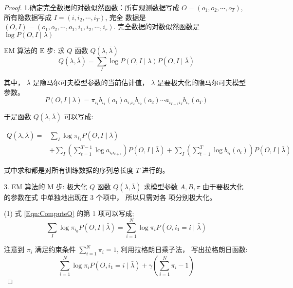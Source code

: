 \begin{proof}
    1.确定完全数据的对数似然函数：所有观测数据写成 $ O=\left(o_{1}, o_{2}, \cdots, o_{T}\right) $, 所有隐数据写成 $ I=\left(i, i_{2}, \cdots, i_{T}\right) $, 完全 数据是 $ (O, I)=\left(o_{1}, o_{2}, \cdots, o_{T}, i_{1}, i_{2}, \cdots, i_{r}\right) . $ 完全数据的对数似然函数是 $ \log P(O, I \mid \lambda) $


EM 算法的 $ \mathrm{E} $ 步: 求 $ Q $ 函数 $ Q(\lambda, \bar{\lambda}) $
\begin{equation}
Q(\lambda, \bar{\lambda})=\sum_{I} \log P(O, I \mid \lambda) P(O, I \mid \bar{\lambda})
\end{equation}

其中， $ \bar{\lambda} $ 是隐马尔可夫模型参数的当前估计值， $ \lambda $ 是要极大化的隐马尔可夫模型参数。
\begin{equation} P(O, I \mid \lambda)=\pi_{i_{1}} b_{i_{1}}\left(o_{1}\right) a_{i_1 i_{2}} b_{i_{2}}\left(o_{2}\right) \cdots a_{i_{T-1} i_{T}} b_{i_{r}}\left(o_{T}\right) \end{equation}

于是函数 $ Q(\lambda, \bar{\lambda}) $ 可以写成:

\begin{equation}
    \label{Eqn:ComputeQ}
\begin{aligned}
Q(\lambda, \bar{\lambda})=& \sum_{I} \log \pi_{i_1} P(O, I \mid \bar{\lambda}) \\
&+\sum_{I}\left(\sum_{t=1}^{T-1} \log a_{i_t i_{t+1}}\right) P(O, I \mid \bar{\lambda})+\sum_{I}\left(\sum_{t=1}^{T} \log b_{i_{t}}\left(o_{t}\right)\right) P(O, I \mid \bar{\lambda})
\end{aligned}
\end{equation}


式中求和都是对所有训练数据的序列总长度 $ T $ 进行的。


3. EM 算法的 $ \mathrm{M} $ 步: 极大化 $ Q $ 函数 $ Q(\lambda, \bar{\lambda}) $ 求模型参数 $ A, B, \pi $ 由于要极大化的参数在式 中单独地出现在 3 个项中， 所以只需对各 项分别极大化。

(1) 式 \ref{Eqn:ComputeQ} 的第 1 项可以写成;
\begin{equation}
\sum_{I} \log \pi_{i_{0}} P(O, I \mid \bar{\lambda})=\sum_{i=1}^{N} \log \pi_{i} P\left(O, i_{1}=i \mid \bar{\lambda}\right)
\end{equation}

注意到 $ \pi_{i} $ 满足约束条件 $ \sum_{i=1}^{N} \pi_{i}=1 $, 利用拉格朗日乘子法， 写出拉格朗日函数:
\begin{equation}
\sum_{i=1}^{N} \log \pi_{i} P\left(O, i_{1}=i \mid \bar{\lambda}\right)+\gamma\left(\sum_{i=1}^{N} \pi_{i}-1\right)
\end{equation}


\end{proof}
